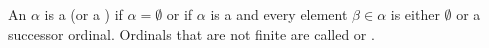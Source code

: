 \begin{definition} \label{definition:finite_ordinal}
An  $\alpha$ is a  (or a ) if $\alpha = \emptyset$ or if $\alpha$ is a  and every element $\beta \in \alpha$ is either $\emptyset$ or a successor ordinal. Ordinals that are not finite are called  or .
\end{definition}